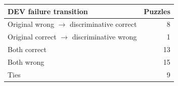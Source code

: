 \begin{table}[t]
\centering
\small
\begin{tabular}{lr}
\toprule
DEV failure transition & Puzzles \\
\midrule
Original wrong $\rightarrow$ discriminative correct & 8 \\
Original correct $\rightarrow$ discriminative wrong & 1 \\
Both correct & 13 \\
Both wrong & 15 \\
Ties & 9 \\
\bottomrule
\end{tabular}
\end{table}
